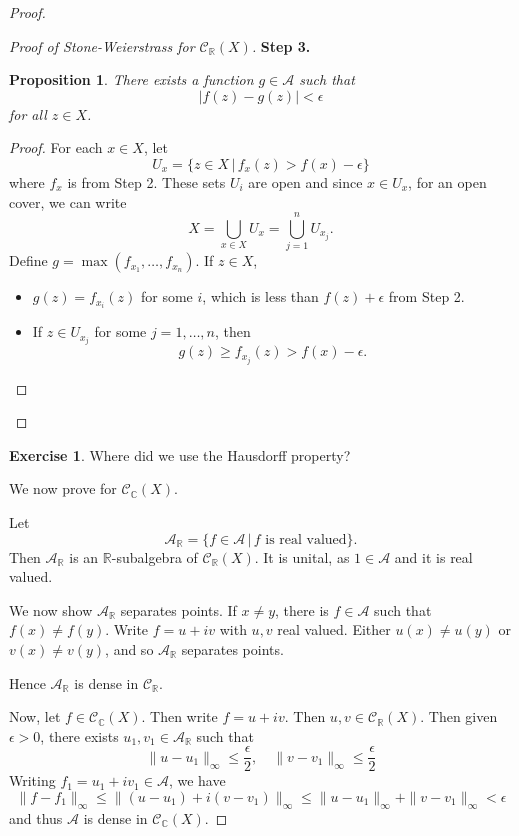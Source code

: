 \documentclass[10pt, oneside, reqno]{amsart}
\theoremstyle{plain}%
\newtheorem{prop}[thm]{Proposition}
\theoremstyle{definition}
\newtheorem{exer}[thm]{Exercise}
\theoremstyle{remark}
\newcommand{\given}{ \, | \,}
\newcommand{\R}{\mathbb{R}}
\newcommand{\Com}{\mathbb{C}}
\begin{document}
\begin{proof}
\begin{proof}[Proof of Stone-Weierstrass for $\mathcal{C}_\R(X)$]
        \textbf{Step 3.}  \begin{prop}
            There exists a function $g \in \mathcal{A}$ such that \[
                |f(z) - g(z) | < \epsilon
            \] for all $z \in X$.  
        \end{prop}
        \begin{proof}
            For each $x \in X$, let \[
                U_x = \{ z \in X \, | \, f_x(z) > f(x) - \epsilon \} 
            \] where $f_x$ is from Step 2.  These sets $U_i$ are open and since $x \in U_x$, for an open cover, we can write \[
                X = \bigcup_{x \in X} U_x = \bigcup_{j=1}^n U_{x_j}.
            \]  
            Define $g = \max(f_{x_1}, \dots, f_{x_n})$.  If $z \in X$, 
            \begin{itemize}
                \item $g(z) = f_{x_i}(z)$ for some $i$, which is less than $f(z) + \epsilon$ from Step 2.
                \item If $z \in U_{x_j}$ for some $j = 1, \dots, n$, then \[
                    g(z) \geq f_{x_j}(z) > f(x) - \epsilon.  
                \]
            \end{itemize}
        \end{proof} 
    \end{proof}
    \begin{exer}
        Where did we use the Hausdorff property?
    \end{exer}
    
    We now prove for $\mathcal{C}_\Com(X)$.  
    
    Let \[ 
    \mathcal A_\R = \{ f \in \mathcal A \given \text{$f$ is real valued} \}. 
    \]  Then $\mathcal A_\R$ is an $\R$-subalgebra of $\mathcal C_\R(X)$.  It is unital, as $1 \in \mathcal A$ and it is real valued. 
    
    We now show $\mathcal A_\R$ separates points.  If $x \neq y$, there is $f \in \mathcal A$ such that $f(x) \neq f(y)$.  Write $f = u + iv$ with $u,v$ real valued.  Either $u(x) \neq u(y)$ or $v(x) \neq v(y)$, and so $\mathcal A_\R$ separates points.  
    
    Hence $\mathcal A_\R$ is dense in $\mathcal C_\R$.  
    
    Now, let $f \in \mathcal C_\Com(X)$.  Then write $f = u + iv$.  Then $u,v \in \mathcal C_\R(X)$.  Then given $\epsilon > 0$, there exists $u_1,v_1 \in \mathcal A_\R$ such that \[
        \| u - u_1 \|_\infty \leq \frac{\epsilon}{2}, \quad \| v - v_1 \|_\infty \leq \frac{\epsilon}{2} 
    \]  Writing $f_1 = u_1 + i v_1 \in \mathcal{A}$, we have \[
        \| f - f_1 \|_\infty \leq \| (u - u_1) + i(v-v_1) \|_\infty \leq \| u - u_1 \|_\infty + \| v - v_1 \|_\infty < \epsilon
    \] and thus $\mathcal{A}$ is dense in $\mathcal C_\Com(X)$.
\end{proof}
\end{document}
